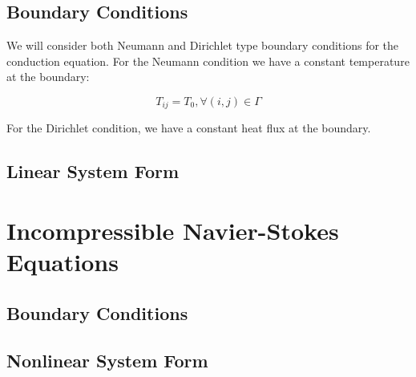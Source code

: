 \documentclass[letterpaper,12pt]{article}
\begin{document}
\subsection{Boundary Conditions}

We will consider both Neumann and Dirichlet type boundary conditions
for the conduction equation. For the Neumann condition we have a
constant temperature at the boundary:

\begin{equation}
  T_{ij} = T_0, \forall (i,j) \in \Gamma
  \label{eq:conduction_neumann}
\end{equation}

For the Dirichlet condition, we have a constant heat flux at the
boundary.

\subsection{Linear System Form}

\section{Incompressible Navier-Stokes Equations}

\subsection{Boundary Conditions}

\subsection{Nonlinear System Form}

\pagebreak
 
\end{document}
